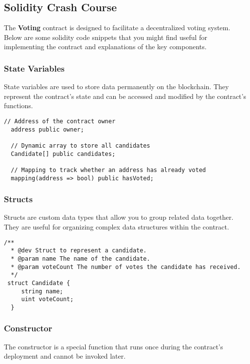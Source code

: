 \documentclass[12pt]{article}
\begin{document}
\subsection{Solidity Crash Course}

The \textbf{Voting} contract is designed to facilitate a decentralized voting system. Below are some solidity code snippets that you might find useful for implementing the contract and explanations of the key components.

\subsubsection*{State Variables}

State variables are used to store data permanently on the blockchain. They represent the contract's state and can be accessed and modified by the contract's functions.

\begin{lstlisting}[language=Solidity]
  // Address of the contract owner
  address public owner;

  // Dynamic array to store all candidates
  Candidate[] public candidates;

  // Mapping to track whether an address has already voted
  mapping(address => bool) public hasVoted;
\end{lstlisting}

\subsubsection*{Structs}

Structs are custom data types that allow you to group related data together. They are useful for organizing complex data structures within the contract.

\begin{lstlisting}[language=Solidity]
  /**
  * @dev Struct to represent a candidate.
  * @param name The name of the candidate.
  * @param voteCount The number of votes the candidate has received.
  */
 struct Candidate {
     string name;
     uint voteCount;
  }
\end{lstlisting}

\subsubsection*{Constructor}

The constructor is a special function that runs once during the contract's deployment and cannot be invoked later.
\end{document}
